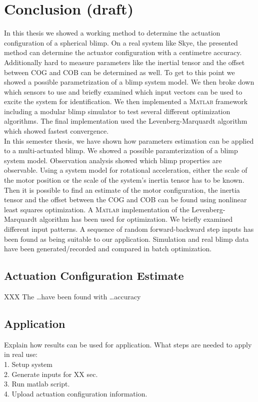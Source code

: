 \chapter{Conclusion (draft)}
\label{chap:conclusion}

In this thesis we showed a working method to determine the actuation configuration of a spherical blimp.
On a real system like Skye, the presented method can determine the actuator configuration with a centimetre accuracy.
Additionally hard to measure parameters like the inertial tensor and the offset between COG and COB can be determined as well.
To get to this point we showed a possible parametrization of a blimp system model.
We then broke down which sensors to use and briefly examined which input vectors can be used to excite the system for identification.
We then implemented a \textsc{Matlab} framework including a modular blimp simulator to test several different optimization algorithms.
The final implementation used the Levenberg-Marquardt algorithm which showed fastest convergence.\\


In this semester thesis, we have shown how parameters estimation can be applied to a multi-actuated blimp.
We showed a possible paramterization of a blimp system model.
Observation analysis showed which blimp properties are observable.
Using a system model for rotational acceleration, either the scale of the motor position or the scale of the system's inertia tensor has to be known.
Then it is possible to find an estimate of the motor configuration, the inertia tensor and the offset between the COG and COB can be found using nonlinear least squares optimization.
A \textsc{Matlab} implementation of the Levenberg-Marquardt algorithm has been used for optimization.
We briefly examined different input patterns.
A sequence of random forward-backward step inputs has been found as being suitable to our application.
Simulation and real blimp data have been generated/recorded and compared in batch optimization.

\section{Actuation Configuration Estimate}
XXX
The \dots have been found with \dots accuracy


\section{Application}
Explain how results can be used for application.
What steps are needed to apply in real use: \\
1. Setup system \\
2. Generate inputs for XX sec. \\
3. Run matlab script. \\
4. Upload actuation configuration information.

